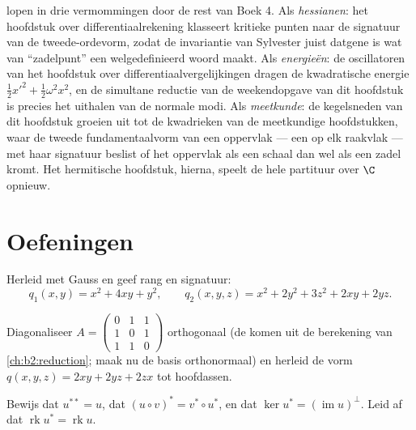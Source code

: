 \begin{remark}
 lopen in drie vermommingen door de rest van
Boek 4. Als \emph{hessianen}: het hoofdstuk over
differentiaalrekening klasseert kritieke punten naar de signatuur
van de tweede-ordevorm, zodat de invariantie van Sylvester juist
datgene is wat van ``zadelpunt'' een welgedefinieerd woord maakt.
Als \emph{energieën}: de oscillatoren van het hoofdstuk over
differentiaalvergelijkingen dragen de kwadratische energie
$\frac12x'^2 + \frac12\omega^2x^2$, en de simultane reductie van de
weekendopgave van dit hoofdstuk is precies het uithalen van de
normale modi. Als \emph{meetkunde}: de kegelsneden van dit
hoofdstuk groeien uit tot de kwadrieken van de meetkundige
hoofdstukken, waar de tweede fundamentaalvorm van een oppervlak ---
een  op elk raakvlak --- met haar signatuur
beslist of het oppervlak als een schaal dan wel als een zadel
kromt. Het hermitische hoofdstuk, hierna, speelt de hele partituur
over $\C$ opnieuw.
\end{remark}

\section{Oefeningen}

\begin{exercise}[$\star$]\label{exo:b2:quadratic:1}
Herleid met Gauss en geef rang en signatuur:
\[
q_1(x,y) = x^2 + 4xy + y^2,
\qquad
q_2(x,y,z) = x^2 + 2y^2 + 3z^2 + 2xy + 2yz .
\]
\end{exercise}

\begin{exercise}[$\star$]\label{exo:b2:quadratic:2}
Diagonaliseer $A = \begin{pmatrix} 0 & 1 & 1\\ 1 & 0 & 1\\ 1 & 1 &
0\end{pmatrix}$ orthogonaal (de  komen uit de
berekening van \cref{ch:b2:reduction}; maak nu de basis
orthonormaal) en herleid de vorm $q(x,y,z) = 2xy + 2yz + 2zx$ tot
hoofdassen.
\end{exercise}

\begin{exercise}[$\star$]\label{exo:b2:quadratic:3}
Bewijs dat $u^{**} = u$, dat $(u \circ v)^* = v^* \circ u^*$, en
dat $\ker u^* = (\operatorname{im} u)^{\perp}$. Leid af dat
$\operatorname{rk} u^* = \operatorname{rk} u$.
\end{exercise}

